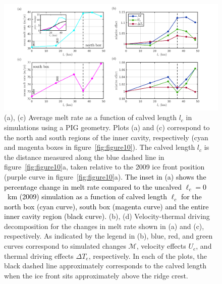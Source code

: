 \documentclass[draft]{agujournal2019}
\newcommand{\blue}[1]{\textcolor{blue}{#1}}
\renewcommand{\blue}[1]{{\textcolor{black}{#1}}} %
\begin{document}
\begin{figure}
    \centering
    \includegraphics[width = \textwidth]{../make_figures/plots/figure13.png}
    \caption{(a), (c) Average melt rate as a function of calved length $l_c$ in simulations using a PIG geometry. Plots (a) and (c) correspond to the north and south regions of the inner cavity, respectively (cyan and magenta boxes in figure~\ref{fig:figure10}). The calved length $l_c$ is the distance measured along the blue dashed line in figure~\ref{fig:figure10}a, taken relative to the 2009 ice front position (purple curve in figure~\ref{fig:figure10}a). \blue{The inset in (a) shows the percentage change in melt rate compared to the uncalved $\ell_c =0$~km (2009) simulation as a function of calved length $\ell_c$ for the north box (cyan curve), south box (magenta curve) and the entire inner cavity region (black curve).} (b), (d) Velocity-thermal driving decomposition for the changes in melt rate shown in (a) and (c), respectively. As indicated by the legend in (b), blue, red, and green curves correspond to simulated changes $\mathcal{M}$, velocity effects $U_e$, and thermal driving effects $\Delta T_e$, respectively. In each of the plots, the black dashed line approximately corresponds to the calved length when the ice front sits approximately above the ridge crest.}\label{fig:figure13}
\end{figure}
\end{document}
